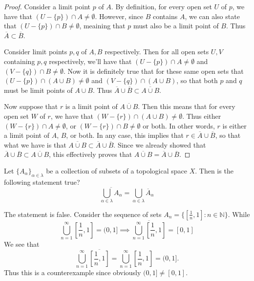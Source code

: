 \documentclass[letterpaper,12pt,twoside]{maths}
\begin{document}
\begin{proof}
    Consider a limit point $p$ of $A$. By definition, for every open
    set $U$ of $p$, we have that $(U - \{p\}) \cap A \ne \emptyset.$
    However, since $B$ contains $A$, we can also state that $(U -
    \{p\}) \cap B \ne \emptyset$, meaining that $p$ must also be a
    limit point of $B$. Thus $\overline{A} \subset \overline{B}.$ 

    Consider limit points $p, q$ of $A, B$ respectively. Then for all
    open sets $U, V$ containing $p, q$ respectively, we'll have that
    $(U - \{p\}) \cap A \ne \emptyset$ and $(V - \{q\}) \cap B \ne
    \emptyset$. Now it is definitely true that for these same open
    sets that $(U - \{p\}) \cap (A \cup B) \ne \emptyset$ and $(V -
    \{q\}) \cap (A\cup B)$, so that both $p$ and $q$ must be limit
    points of $A \cup B$. Thus $\overline{A} \cup \overline{B} \subset
    \overline{A \cup B}.$ 
    
    Now suppose that $r$ is a limit point of
    $\overline{A \cup B}.$ Then this means that for every open set $W$
    of $r$, we have that $(W - \{r\}) \cap (A \cup B) \ne \emptyset.$
    Thus either $(W - \{r\}) \cap A \ne \emptyset$, or $(W - \{r\})
    \cap B \ne \emptyset$ or both. In other words, $r$ is either a
    limit point of $A$, $B$, or both. In any case, this implies that
    $r \in \overline{A}\cup\overline{B}$, so that what we have is that
    $\overline{A \cup B} \subset \overline{A} \cup \overline{B}$.
    Since we already showed that $\overline{A}\cup\overline{B} \subset
    \overline{A \cup B}$, this effectively proves that $\overline{A
    \cup B} = \overline{A} \cup \overline{B}.$

\end{proof}

\begin{exercise}[Exercise 3.23]
    Let $\{A_\alpha\}_{\alpha \in \lambda}$ be a
    collection of subsets of a topological space $X$. Then is the
    following statement true?
    $$
    \overline{\bigcup\limits_{\alpha \in \lambda} A_{\alpha}} = \bigcup\limits_{\alpha \in \lambda} \overline{A}_\alpha
    $$
\end{exercise}

\begin{solution}
    The statement is false. Consider the sequence of sets $A_n = 
\{[\frac{1}{n}, 1] : n \in \mathbb{N}\}$. While 
\[
    \bigcup_{n = 1}^\infty \left[\frac{1}{n}, 1\right] = (0, 1] 
    \implies
    \overline{\bigcup_{n = 1}^\infty \left[\frac{1}{n}, 1\right]} = [0, 1]
\]
We see that 
\[
    \bigcup_{n = 1}^\infty \overline{\left[\frac{1}{n}, 1\right]} = 
    \bigcup_{n = 1}^\infty \left[\frac{1}{n}, 1\right] = (0, 1].
\]
Thus this is a counterexample since obviously $(0, 1] \ne [0, 1]$.

\end{solution}
\end{document}
